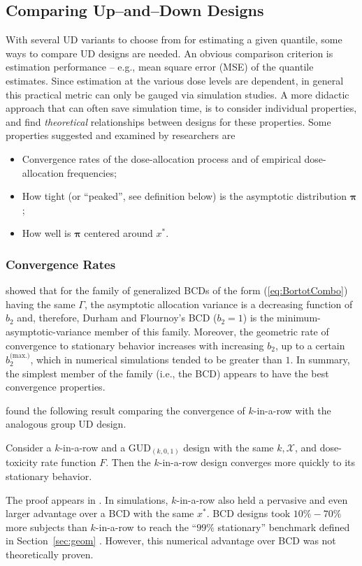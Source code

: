 \subsection{Comparing Up--and--Down Designs}

With several UD variants to choose from for estimating a given quantile, some ways to compare UD designs are needed. An obvious comparison criterion is estimation performance -- e.g., mean square error (MSE) of the quantile estimates. Since estimation at the various dose levels are dependent, in general this practical metric can only be gauged via simulation studies. A more didactic approach that can often save simulation time, is to consider individual properties, and find \emph{theoretical} relationships between designs for these properties. Some properties suggested and examined by researchers are
%
\begin{itemize}
\item Convergence rates of the dose-allocation process and of empirical dose-allocation frequencies;
\item How tight (or ``peaked'', see definition below) is the asymptotic distribution $\boldsymbol{\pi}$;
\item How well is $\boldsymbol{\pi}$ centered around $x^*$.
\end{itemize}

\subsubsection{Convergence Rates}

\cite{Bort:Giov:Upan:2005} showed that for the family of generalized BCDs of the form (\ref{eq:BortotCombo}) having the same $\Gamma$, the asymptotic allocation variance is a decreasing function of $b_2$ and, therefore, Durham and Flournoy's BCD ($b_2=1$) is the minimum-asymptotic-variance member of this family. Moreover, the geometric rate of convergence to stationary behavior increases with increasing $b_2$, up to a certain $b_2^\textrm{(max.)}$, which in numerical simulations tended to be greater than $1$. In summary, the simplest member of the family (i.e., the BCD) appears to have the best convergence properties.

\cite{Oron:Hoff:thek:2009} found the following result comparing the convergence of $k$-in-a-row with the analogous group UD design.
%
\begin{thm}\label{thm:krgudconv} Consider a $k$-in-a-row and a GUD$_{(k,0,1)}$ design with the same $k,\mathcal{X}$, and dose-toxicity rate function $F$. Then the $k$-in-a-row design converges more quickly to its stationary behavior.\end{thm}
%
\noindent The proof appears in \cite{Oron:Hoff:thek:2009}. In simulations, $k$-in-a-row also held a pervasive and even larger advantage over a BCD with the same $x^*$. BCD designs took $10\%-70\%$ more subjects than $k$-in-a-row to reach the ``$99\%$ stationary'' benchmark defined in Section~\ref{sec:geom} \citep{Oron:Hoff:thek:2009}. However, this numerical advantage over BCD was not theoretically proven.

